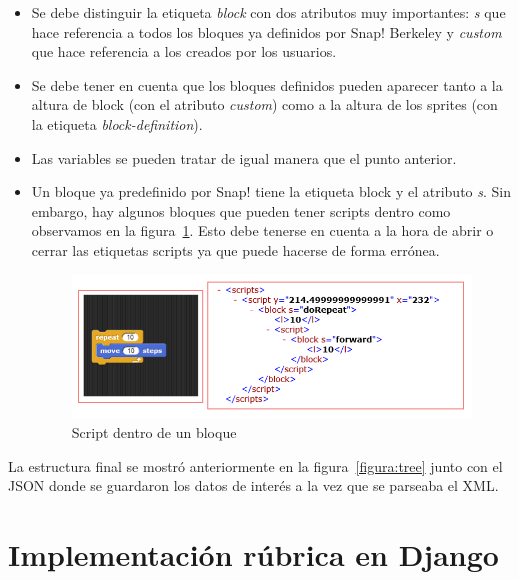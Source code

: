 \documentclass[a4paper, 12pt]{book}
\begin{document}
\begin{itemize}
    \item Se debe distinguir la etiqueta \textit{block} con dos atributos muy importantes: \textit{s} que hace referencia a todos los bloques ya definidos por Snap! Berkeley y \textit{custom} que hace referencia a los creados por los usuarios. 
    \item Se debe tener en cuenta que los bloques definidos pueden aparecer tanto a la altura de block (con el atributo \textit{custom}) como a la altura de los sprites (con la etiqueta \textit{block-definition}).
    \item Las variables se pueden tratar de igual manera que el punto anterior.
    \item Un bloque ya predefinido por Snap! tiene la etiqueta block y el atributo \textit{s}. Sin embargo, hay algunos bloques que pueden tener scripts dentro como observamos en la figura~\ref{figura:script-block}. Esto debe tenerse en cuenta a la hora de abrir o cerrar las etiquetas scripts ya que puede hacerse de forma errónea.
    \begin{figure}[h]
            \centering
            \includegraphics[scale=0.5]{img/block-script.PNG}
            \caption{Script dentro de un bloque}
            \label{figura:script-block}
        \end{figure}
\end{itemize}
 La estructura final se mostró anteriormente en la figura~\ref{figura:tree} junto con el JSON donde se guardaron los datos de interés a la vez que se parseaba el XML.
 
 \section{Implementación rúbrica en Django}
 

\end{document}
